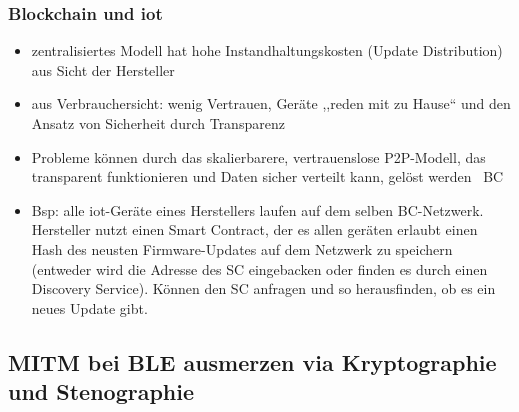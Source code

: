     \subsubsection*{Blockchain und \gls{iot}}
        \begin{itemize}
            \item zentralisiertes Modell hat hohe Instandhaltungskosten (Update Distribution) aus Sicht der Hersteller
            \item aus Verbrauchersicht: wenig Vertrauen, Geräte ,,reden mit zu Hause`` und den Ansatz von Sicherheit durch Transparenz
            \item Probleme können durch das skalierbarere, vertrauenslose P2P-Modell, das transparent funktionieren und Daten sicher verteilt kann, gelöst werden \textrightarrow\ BC
            \item Bsp: alle \gls{iot}-Geräte eines Herstellers laufen auf dem selben BC-Netzwerk. Hersteller nutzt einen Smart Contract, der es allen geräten erlaubt einen Hash des neusten Firmware-Updates auf dem Netzwerk zu speichern (entweder wird die Adresse des SC eingebacken oder finden es durch einen Discovery Service). Können den SC anfragen und so herausfinden, ob es ein neues Update gibt.
        \end{itemize}

\subsection*{MITM bei BLE ausmerzen via Kryptographie und Stenographie}\cite{Bapat2017}
